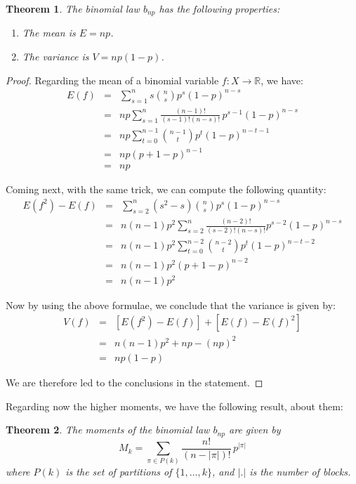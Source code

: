 \documentclass[12pt]{amsbook}
\newtheorem{theorem}{Theorem}[chapter]
\begin{document}
\begin{theorem}
The binomial law $b_{np}$ has the following properties:
\begin{enumerate}
\item The mean is $E=np$.

\item The variance is $V=np(1-p)$.
\end{enumerate}
\end{theorem}

\begin{proof}
Regarding the mean of a binomial variable $f:X\to\mathbb R$, we have:
\begin{eqnarray*}
E(f)
&=&\sum_{s=1}^ns\binom{n}{s}p^s(1-p)^{n-s}\\
&=&np\sum_{s=1}^n\frac{(n-1)!}{(s-1)!(n-s)!}\,p^{s-1}(1-p)^{n-s}\\
&=&np\sum_{t=0}^{n-1}\binom{n-1}{t}p^t(1-p)^{n-t-1}\\
&=&np(p+1-p)^{n-1}\\
&=&np
\end{eqnarray*}

Coming next, with the same trick, we can compute the following quantity:
\begin{eqnarray*}
E(f^2)-E(f)
&=&\sum_{s=2}^n(s^2-s)\binom{n}{s}p^s(1-p)^{n-s}\\
&=&n(n-1)p^2\sum_{s=2}^n\frac{(n-2)!}{(s-2)!(n-s)!}p^{s-2}(1-p)^{n-s}\\
&=&n(n-1)p^2\sum_{t=0}^{n-2}\binom{n-2}{t}p^t(1-p)^{n-t-2}\\
&=&n(n-1)p^2(p+1-p)^{n-2}\\
&=&n(n-1)p^2
\end{eqnarray*}

Now by using the above formulae, we conclude that the variance is given by:
\begin{eqnarray*}
V(f)
&=&[E(f^2)-E(f)]+[E(f)-E(f)^2]\\
&=&n(n-1)p^2+np-(np)^2\\
&=&np(1-p)
\end{eqnarray*}

We are therefore led to the conclusions in the statement.
\end{proof}

Regarding now the higher moments, we have the following result, about them:


\begin{theorem}
The moments of the binomial law $b_{np}$ are given by
$$M_k=\sum_{\pi\in P(k)}\frac{n!}{(n-|\pi|)!}\,p^{|\pi|}$$
where $P(k)$ is the set of partitions of $\{1,\ldots,k\}$, and $|.|$ is the number of blocks.
\end{theorem}
\end{document}
